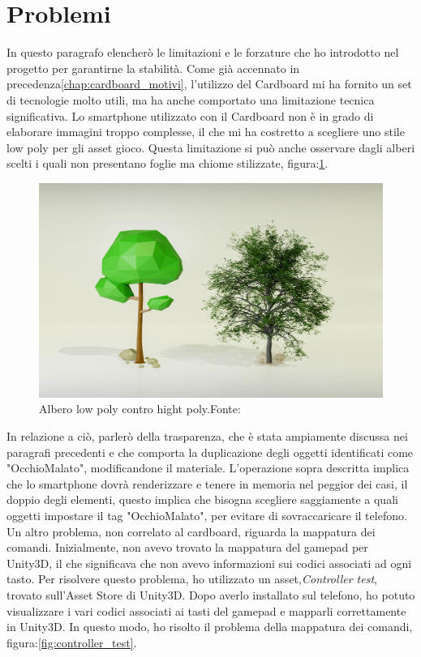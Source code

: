 \documentclass[
a4paper,
cleardoublepage=empty,
headings=twolinechapter,
numbers=autoenddot,
]{scrbook}
\begin{document}
    \section{Problemi}
    In questo paragrafo elencherò le limitazioni e le forzature che ho introdotto nel progetto per garantirne la stabilità. Come già accennato in precedenza\ref{chap:cardboard_motivi}, l'utilizzo del Cardboard mi ha fornito un set di tecnologie molto utili, ma ha anche comportato una limitazione tecnica significativa. Lo smartphone utilizzato con il Cardboard non è in grado di elaborare immagini troppo complesse, il che mi ha costretto a scegliere uno stile low poly per gli asset  gioco.
    Questa limitazione si può anche osservare dagli alberi scelti i quali non presentano foglie ma chiome stilizzate, figura:\ref{fig:low_hight}.
    \begin{figure}[h]
		\centering
		\includegraphics[width=0.6\linewidth]{image/low_hight}
		\caption{Albero low poly contro hight poly.Fonte:\cite{low_high}}
		\label{fig:low_hight}
    \end{figure}
    In relazione a ciò, parlerò della trasparenza, che è stata ampiamente discussa nei paragrafi precedenti e che comporta la duplicazione degli oggetti identificati come "OcchioMalato", modificandone il materiale.
    L'operazione sopra descritta implica che lo smartphone dovrà renderizzare e tenere in memoria nel peggior dei casi, il doppio degli elementi, questo implica che bisogna scegliere saggiamente a quali oggetti impostare il tag "OcchioMalato", per evitare di sovraccaricare il telefono.
    Un altro problema, non correlato al cardboard, riguarda la mappatura dei comandi. Inizialmente, non avevo trovato la mappatura del gamepad per Unity3D, il che significava che non avevo informazioni sui codici associati ad ogni tasto.
    Per risolvere questo problema, ho utilizzato un asset,\textit{Controller test}\cite{Controller_test}, trovato sull'Asset Store di Unity3D. Dopo averlo installato sul telefono, ho potuto visualizzare i vari codici associati ai tasti del gamepad e mapparli correttamente in Unity3D. In questo modo, ho risolto il problema della mappatura dei comandi, figura:\ref{fig:controller_test}.
\end{document}
